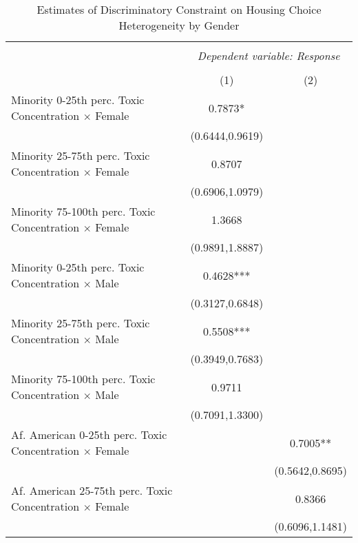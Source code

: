  \begin{table}[H] \scriptsize \centering \begin{threeparttable} \captionsetup{justification=centering}   \caption{Estimates of Discriminatory Constraint on Housing Choice \\ Heterogeneity by Gender }   \label{tab:heterogeneitygender}  \begin{tabular}{@{\extracolsep{5pt}}lcc} \\[-1.8ex]\hline \hline \\[-1.8ex]  & \multicolumn{2}{c}{\textit{Dependent variable: {\it  Response}}} \\  \cline{2-3}  \\[-1.8ex] & (1) & (2)  \\        
\hline
Minority 0-25th perc. Toxic Concentration $\times$ Female&      0.7873*  &               \\
                    &(0.6444,0.9619)   &               \\
Minority 25-75th perc. Toxic Concentration $\times$ Female&      0.8707   &               \\
                    &(0.6906,1.0979)   &               \\
Minority 75-100th perc. Toxic Concentration $\times$ Female&      1.3668   &               \\
                    &(0.9891,1.8887)   &               \\
Minority 0-25th perc. Toxic Concentration $\times$ Male&      0.4628***&               \\
                    &(0.3127,0.6848)   &               \\
Minority 25-75th perc. Toxic Concentration $\times$ Male&      0.5508***&               \\
                    &(0.3949,0.7683)   &               \\
Minority 75-100th perc. Toxic Concentration $\times$ Male&      0.9711   &               \\
                    &(0.7091,1.3300)   &               \\
Af. American 0-25th perc. Toxic Concentration $\times$ Female&               &      0.7005** \\
                    &               &(0.5642,0.8695)   \\
Af. American 25-75th perc. Toxic Concentration $\times$ Female&               &      0.8366   \\
                    &               &(0.6096,1.1481)   \\

\end{tabular}
\end{threeparttable}
\end{table}
